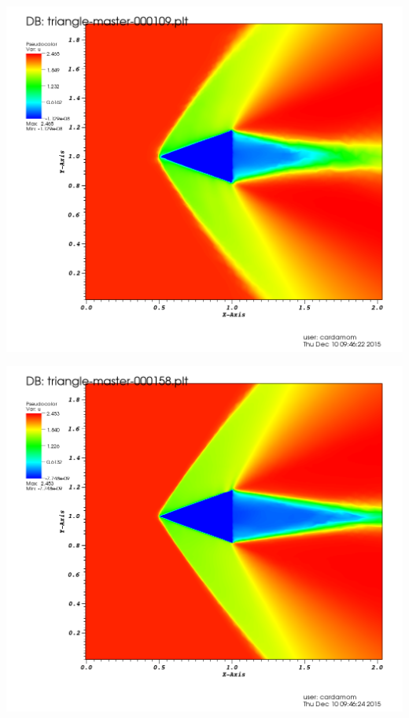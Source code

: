 \begingroup
	\begin{minipage}[t]{.5\linewidth}
		\centering
		\includegraphics[scale=.2]{Bordeaux/figures/AdapPhysique/Plot4bI0A.png}
	\end{minipage}
	\hfill
	\begin{minipage}[t]{.5\linewidth}
		\centering
		\includegraphics[scale=.2]{Bordeaux/figures/AdapPhysique/Plot4bI1A.png}
	\end{minipage}
